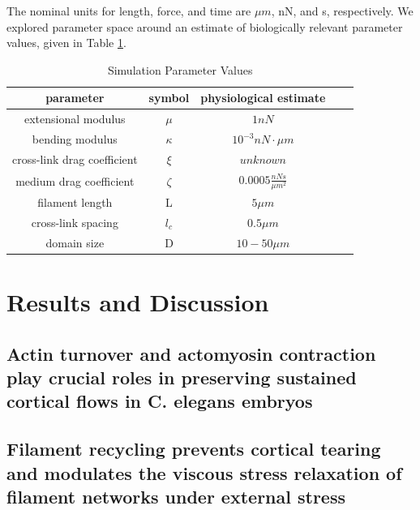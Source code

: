 \documentclass[10pt,letterpaper]{article}
\begin{document}
The nominal units for length, force, and time are $\mu m$, nN, and s, respectively.  We explored parameter space around an estimate of biologically relevant parameter values, given in Table \ref{table:para}. 

\begin{table}[h]
\centering
\caption{Simulation Parameter Values}
\label{table:para}
\begin{tabular}{|c|c|c|c|c|}
\hline
{\bf parameter}             & {\bf symbol} & {\bf physiological estimate}          \\ \hline
extensional modulus         & $\mu$        & $1 nN $                                               \\
bending modulus             & $\kappa$     & $ 10^{-3} nN \cdot \mu m$                           \\
cross-link drag coefficient & $\xi$      & $unknown $              \\
medium drag coefficient     & $\zeta$        & $0.0005 \frac{nN s}{\mu m^2} $      \\
filament length             & L            & $5 \mu m$                                          \\
cross-link spacing          & $l_c$        & $0.5 \mu m$                                         \\
domain size                 & D            & $10-50 \mu m$                                 \\ \hline
\end{tabular}
\end{table}



\section*{Results and Discussion}

\subsection*{Actin turnover and actomyosin contraction play crucial roles in preserving sustained cortical flows in C. elegans embryos}

\subsection*{Filament recycling prevents cortical tearing and modulates the viscous stress relaxation of filament networks under external stress}
\end{document}
